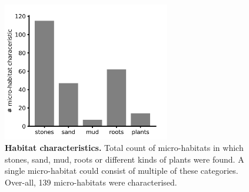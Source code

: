 \begin{figure}[H]
    \centering
    \includegraphics[width=0.65\textwidth]{pictures/Results/JULE_habitat_ccharacteristics.png}
    \caption{\textbf{Habitat characteristics.} Total count of micro-habitats in which stones, sand, mud, roots or different kinds of plants were found. A single micro-habitat could consist of multiple of these categories. Over-all, 139 micro-habitats were characterised.}
    \label{fig:habitat_count}
\end{figure}

